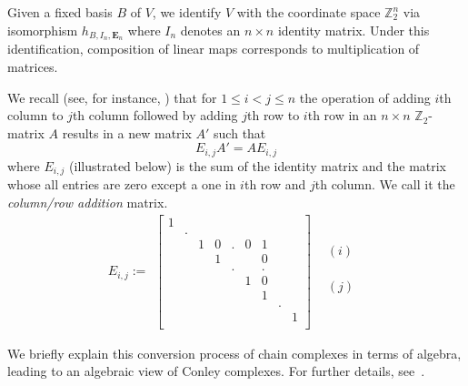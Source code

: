 \documentclass[a4paper,english,cleveref]{article}
\theoremstyle{plain}
\def\bE{\text{$\mathbf E$}}
\def\mathobj#1{\mbox{$#1$}}
\def\ZZ{\mathobj{\mathbb{Z}}}
\newcounter{li}
\begin{document}
{Given a fixed basis $B$ of $V$, we identify $V$ with the coordinate space $\ZZ_2^n$ via isomorphism $h_{B,I_n,\bE_n}$
where $I_n$ denotes an $n\times n$ identity matrix. 
Under this identification, composition of linear maps corresponds to multiplication of matrices.


We recall (see, for instance, \cite[Section 3.1]{KaMiMr2004}) 
that for $1\leq i<j\leq n$ the operation of adding $i$th column to $j$th column followed by 
adding $j$th row to $i$th row in an $n\times n$ $\ZZ_2$-matrix $A$
results in a new matrix $A'$ such that 
\begin{equation}
\label{eq:AE}
E_{i,j} A'=A E_{i,j}
\end{equation}
where $E_{i,j}$ (illustrated below) is the sum of the identity matrix and the matrix whose all entries are zero except a one in $i$th row and $j$th column.
We call it the {\em column/row addition} matrix.
      \begin{equation*}
      \label{eq:cl-matrix}
        E_{i,j}:=\begin{array}{cc}
                     \left[
                     \begin{array}{ccccccccc}
                       1 & & & & & & & &  \\
                         &.& & & & & & &  \\
                         & &1&0&.&0&1& &  \\
                         & & &1& & &0& &  \\
                         & & & &.& &.& &  \\
                         & & & & &1&0& &  \\
                         & & & & & &1& &  \\
                         & & & & & & &.&  \\
                         & & & & & & & & 1\\
                     \end{array}
                     \right]
                     &
                     \begin{array}{c}
                          \\
                          \\
                         (i)\\
                          \\
                          \\
                          \\
                         (j)\\
                          \\
                          \\
                     \end{array}
                   \end{array}
      \end{equation*}
}
We briefly explain this conversion process of chain complexes in terms of algebra, leading to an algebraic view of
Conley complexes. For further details, see~\cite{MW2021b}.
\end{document}
